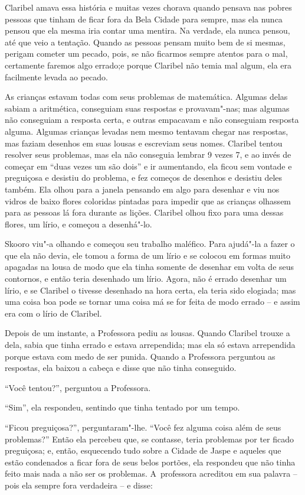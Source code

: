 Claribel amava essa história e muitas vezes chorava quando pensava nas
pobres pessoas que tinham de ficar fora da Bela Cidade para sempre, mas
ela nunca pensou que ela mesma iria contar uma mentira. Na verdade, ela
nunca pensou, até que veio a tentação. Quando as pessoas pensam muito
bem de si mesmas, perigam cometer um pecado, pois, se não ficarmos
sempre atentos para o mal, certamente faremos algo errado;e porque
Claribel não temia mal algum, ela era facilmente levada ao pecado.

As crianças estavam todas com seus problemas de matemática. Algumas
delas sabiam a aritmética, conseguiam suas respostas e provavam"-nas; mas
algumas não conseguiam a resposta certa, e outras empacavam e não
conseguiam resposta alguma. Algumas crianças levadas nem mesmo tentavam
chegar nas respostas, mas faziam desenhos em suas lousas e escreviam
seus nomes. Claribel tentou resolver seus problemas, mas ela não
conseguia lembrar 9 vezes 7, e ao invés de começar em ``duas vezes um
são dois'' e ir aumentando, ela ficou sem vontade e preguiçosa e
desistiu do problema, e fez começos de desenhos e desistiu deles também.
Ela olhou para a janela pensando em algo para desenhar e viu nos vidros
de baixo flores coloridas pintadas para impedir que as crianças olhassem
para as pessoas lá fora durante as lições. Claribel olhou fixo para uma
dessas flores, um lírio, e começou a desenhá"-lo.

Skooro viu"-a olhando e começou seu trabalho maléfico. Para ajudá"-la a
fazer o que ela não devia, ele tomou a forma de um lírio e se colocou em
formas muito apagadas na lousa de modo que ela tinha somente de desenhar
em volta de seus contornos, e então teria desenhado um lírio. Agora, não
é errado desenhar um lírio, e se Claribel o tivesse desenhado na hora
certa, ela teria sido elogiada; mas uma coisa boa pode se tornar uma
coisa má se for feita de modo errado -- e assim era com o lírio de
Claribel.

Depois de um instante, a Professora pediu as lousas. Quando Claribel
trouxe a dela, sabia que tinha errado e estava arrependida; mas ela só
estava arrependida porque estava com medo de ser punida. Quando a
Professora perguntou as respostas, ela baixou a cabeça e disse que não
tinha conseguido.

``Você tentou?'', perguntou a Professora.

``Sim'', ela respondeu, sentindo que tinha tentado por um tempo.

``Ficou preguiçosa?'', perguntaram"-lhe. ``Você fez alguma coisa além de
seus problemas?'' Então ela percebeu que, se contasse, teria problemas por
ter ficado preguiçosa; e, então, esquecendo tudo sobre a Cidade de Jaspe
e aqueles que estão condenados a ficar fora de seus belos portões, ela
respondeu que não tinha feito mais nada a não ser os problemas. A~professora acreditou em sua palavra -- pois ela sempre fora verdadeira
-- e disse:

